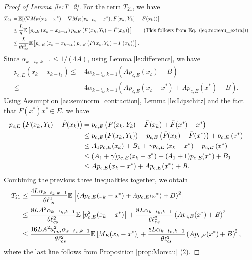 \documentclass[11 pt]{article}
\begin{document}
\begin{proof}[Proof of Lemma \ref{le:T_2}]
		For the term  $T_{21}$, we have
		\begin{align*}
			T_{21}=\,&\mathbb{E}[\langle\nabla M_E(x_k-x^*) - \nabla M_E(x_{k-t_k}-x^*),F(x_k,Y_k)-\Bar{F}(x_k)\rangle] \\
			\leq \,&\frac{L}{\theta} \mathbb{E}\left[p_{s,E}\left(x_k-x_{k-t_k}\right) p_{s,E}\left(F(x_k,Y_k)-\Bar{F}(x_k)\right)\right]\tag{This follows from Eq. (\ref{eq:moreau_extra})}\\
			\leq \,& \frac{L}{\theta \ell^2_{cs}} \mathbb{E}\left[p_{c,E}\left(x_k-x_{k-t_k}\right) p_{c,E}\left(F(x_k,Y_k)-\Bar{F}(x_k)\right)\right].
		\end{align*}
		Since $\alpha_{k-t_k, k-1} \leq 1/(4A)$, using Lemma \ref{le:difference}, we have
		\begin{align*}
			p_{c,E}\left(x_k-x_{k-t_k}\right) \leq\,& 4\alpha_{k-t_k, k-1}\left(Ap_{c,E}(x_{k})+B\right)\\
			\leq \,&4\alpha_{k-t_k, k-1}\left(Ap_{c,E}(x_{k} - x^*)+Ap_{c,E}(x^*)+B\right). 
		\end{align*}
		Using Assumption \ref{as:seminorm_contraction}, Lemma \ref{le:Lipschitz} and the fact that $\bar{F}(x^*) x^*\in E$, we have
		\begin{align*}
			p_{c,E}\left(F(x_k,Y_k)-\Bar{F}(x_k)\right) &= p_{c,E}\left(F(x_k,Y_k)-\Bar{F}(x_k)+ \bar{F}(x^*) - x^*\right)\\
			&\leq p_{c,E}\left(F(x_k,Y_k)\right) + p_{c,E}\left(\Bar{F}(x_k) - \bar{F}(x^*)\right) + p_{c,E}\left(x^*\right)\\
			&\leq A_1p_{c,E}(x_k)+B_1 + \gamma p_{c,E}\left(x_k-x^*\right) + p_{c,E}\left(x^*\right)\\
			&\leq (A_1+\gamma)p_{c,E}(x_k - x^*) + (A_1+1)p_{c,E}(x^*) +B_1\\
			&\leq A p_{c,E}(x_k - x^*) + A p_{c,E}(x^*) + B.
		\end{align*}
		Combining the previous three inequalities together, we obtain 
		\begin{align}\label{eq:T_{21} bound}
			T_{21} &\leq \frac{4L\alpha_{k-t_k, k-1}}{\theta \ell^2_{cs}}\mathbb{E}\left[\left(Ap_{c,E}(x_{k} - x^*)+Ap_{c,E}(x^*)+B\right)^2\right]\nonumber\\  
			&\leq \frac{8LA^2\alpha_{k-t_k, k-1}}{\theta \ell^2_{cs}}\mathbb{E}\left[p^2_{c,E}(x_{k} - x^*)\right] + \frac{8L\alpha_{k-t_k, k-1}}{\theta \ell^2_{cs}}\left(Ap_{c,E}(x^*)+B\right)^2\nonumber\\
			&\leq \frac{16LA^2u^2_{cm}\alpha_{k-t_k, k-1}}{\theta \ell^2_{cs}}\mathbb{E}\left[M_{E}(x_{k} - x^*)\right] + \frac{8L\alpha_{k-t_k, k-1}}{\theta \ell^2_{cs}}\left(Ap_{c,E}(x^*)+B\right)^2,
		\end{align}
		where the last line follows from Proposition \ref{prop:Moreau} (2).
		

\end{proof}
\end{document}
